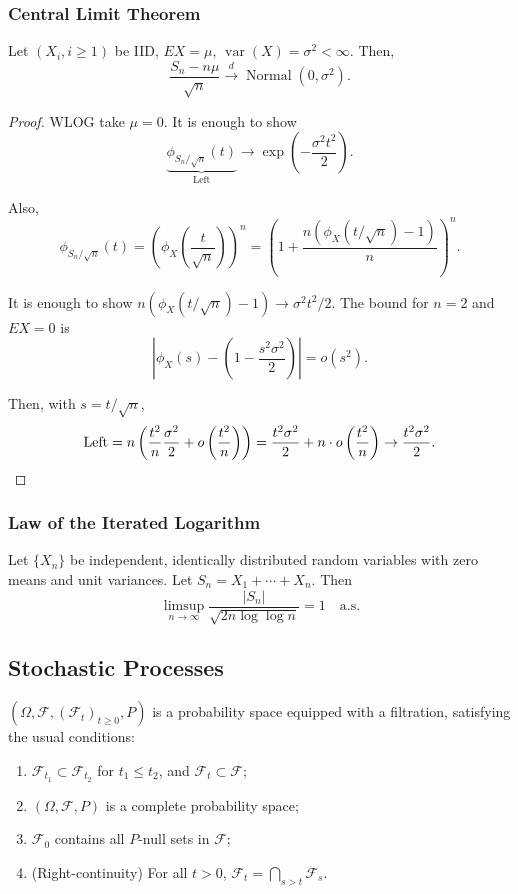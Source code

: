 \subsubsection{Central Limit Theorem}
\begin{thm}
Let $(X_i, i \geq 1)$ be IID, $EX = \mu$, $\operatorname{var}(X) = \sigma^2 < \infty$. Then,
\[
\frac{S_n - n\mu}{\sqrt{n}} \xrightarrow{d} \operatorname{Normal}(0, \sigma^2).
\]
\end{thm}

\begin{proof}
WLOG take $\mu = 0$. It is enough to show
\[
\underbrace{\phi_{S_n/\sqrt{n}}(t)}_{\text{Left}} \to \exp\left(-\frac{\sigma^2 t^2}{2}\right).
\]

Also,
\[
\phi_{S_n/\sqrt{n}}(t) = \left(\phi_X\left(\frac{t}{\sqrt{n}}\right)\right)^n = \left(1 + \frac{n(\phi_X(t/\sqrt{n}) - 1)}{n}\right)^n.
\]

It is enough to show $n(\phi_X(t/\sqrt{n}) - 1) \to \sigma^2 t^2 / 2$. The bound for $n = 2$ and $EX = 0$ is
\[
\left|\phi_X(s) - \left(1 - \frac{s^2 \sigma^2}{2}\right)\right| = o(s^2).
\]

Then, with $s = t/\sqrt{n}$,
\[
\text{Left} = n\left(\frac{t^2}{n}\frac{\sigma^2}{2} + o\left(\frac{t^2}{n}\right)\right) = \frac{t^2 \sigma^2}{2} + n \cdot o\left(\frac{t^2}{n}\right) \to \frac{t^2 \sigma^2}{2}. \qedhere
\]
\end{proof}

\subsubsection{Law of the Iterated Logarithm}
\begin{thm}
Let $\{X_n\}$ be independent, identically distributed random variables with zero means and unit variances. Let $S_n = X_1 + \cdots + X_n$. Then
\[
\limsup_{n \to \infty} \frac{|S_n|}{\sqrt{2n \log \log n}} = 1 \quad \text{a.s.}
\]
\end{thm}

\subsection{Stochastic Processes}
\begin{defn}
$(\Omega, \mathcal{F}, (\mathcal{F}_t)_{t \geq 0}, P)$ is a probability space equipped with a filtration, satisfying the usual conditions:
\begin{enumerate}
    \item $\mathcal{F}_{t_1} \subset \mathcal{F}_{t_2}$ for $t_1 \leq t_2$, and $\mathcal{F}_t \subset \mathcal{F}$;
    \item $(\Omega, \mathcal{F}, P)$ is a complete probability space;
    \item $\mathcal{F}_0$ contains all $P$-null sets in $\mathcal{F}$;
    \item (Right-continuity) For all $t > 0$, $\displaystyle \mathcal{F}_t = \bigcap_{s > t} \mathcal{F}_s$.
\end{enumerate}
\end{defn}

